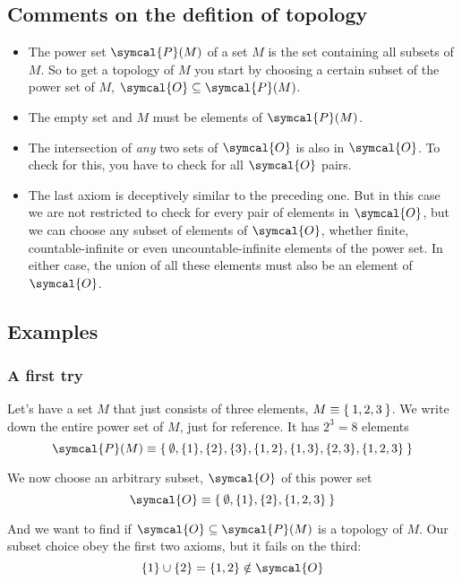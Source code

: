 \subsection{Comments on the defition of topology}
\begin{itemize}
\item The power set $\symcal{P}(M)$ of a set $M$ is the set containing all subsets of
  $M$.
  So to get a topology of $M$ you start by choosing a certain subset of the power set of
  $M$, $\symcal{O} \subseteq\symcal{P}(M)$.
\item The empty set and $M$ must be elements of $\symcal{P}(M)$.
\item The intersection of \emph{any} two sets of $\symcal{O}$ is also in $\symcal{O}$.
  To check for this, you have to check for all $\symcal{O}$ pairs.
\item The last axiom is deceptively similar to the preceding one. But in this case we
  are not restricted to check for every pair of elements in $\symcal{O}$, but we can
  choose any subset
  of elements of $\symcal{O}$, whether finite, countable-infinite or even
  uncountable-infinite
  elements of the power set. In either case, the union of all these elements must also
  be an element of $\symcal{O}$.
\end{itemize}

\subsection{Examples}
\subsubsection{A first try}
Let's have a set $M$ that just consists of three elements, $M\equiv\Set{1,2,3}$. We
write down the entire power set of $M$, just for reference. It has $2^3 = 8$ elements
\[
  \symcal{P}(M)
  \equiv \Set{\emptyset, \{1\}, \{2\}, \{3\}, \{1,2\}, \{1,3\}, \{2,3\}, \{1,2,3\}}
\]

We now choose an arbitrary subset, $\symcal{O}$ of this power set
\[
  \symcal{O} \equiv \Set{\emptyset, \{1\}, \{2\}, \{1,2,3\}}
\]

And we want to find if $\symcal{O} \subseteq \symcal{P}(M)$ is a topology of $M$.
Our subset choice obey the first two axioms, but it fails on the third:
\[
  \{1\}\cup\{2\} = \{1,2\}\notin\symcal{O}
\]

